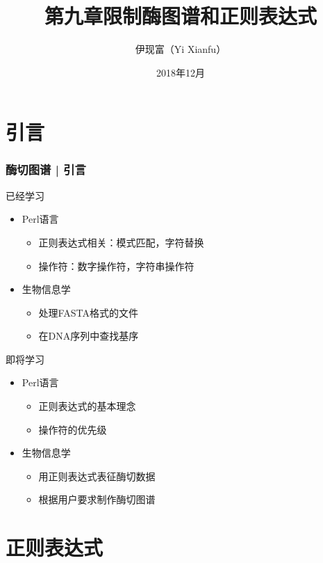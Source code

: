 


\title[限制酶图谱和正则表达式]{第九章\quad 限制酶图谱和正则表达式}
\author[Yixf]{伊现富（Yi Xianfu）}
\date{2018年12月}



\section{引言}
\begin{frame}
  \frametitle{酶切图谱 | 引言}
  \begin{block}{已经学习}
    \begin{itemize}
      \item Perl语言
	\begin{itemize}
	  \item 正则表达式相关：模式匹配，字符替换
	  \item 操作符：数字操作符，字符串操作符
	\end{itemize}
      \item 生物信息学
	\begin{itemize}
	  \item 处理FASTA格式的文件
	  \item 在DNA序列中查找基序
	\end{itemize}
    \end{itemize}
  \end{block}
  \pause
  \begin{block}{即将学习}
    \begin{itemize}
      \item Perl语言
	\begin{itemize}
	  \item 正则表达式的基本理念
	  \item 操作符的优先级
	\end{itemize}
      \item 生物信息学
	\begin{itemize}
	  \item 用正则表达式表征酶切数据
	  \item 根据用户要求制作酶切图谱
	\end{itemize}
    \end{itemize}
  \end{block}
\end{frame}

\section{正则表达式}

